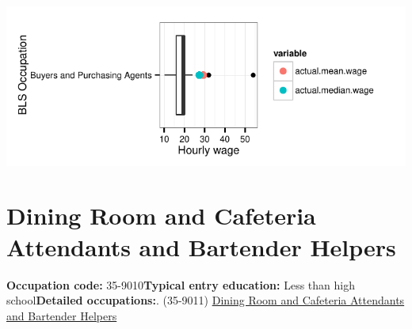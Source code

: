 \documentclass[a4paper,10pt]{article}\usepackage[]{graphicx}\usepackage[]{color}
\makeatletter
\def\maxwidth{ %
  \ifdim\Gin@nat@width>\linewidth
    \linewidth
  \else
    \Gin@nat@width
  \fi
}
\makeatother
\begin{document}
{\centering \includegraphics[width=\maxwidth]{figure/unnamed-chunk-282} 

}


\newpage\section{Dining Room and Cafeteria Attendants and Bartender Helpers}\textbf{Occupation code:} 35-9010\newline\textbf{Typical entry education:} Less than high school\newline\textbf{Detailed occupations:}. (35-9011)  \href{http://www.bls.gov/oes/current/oes359011.htm}{Dining Room and Cafeteria Attendants and Bartender Helpers}\newline%
\end{document}
